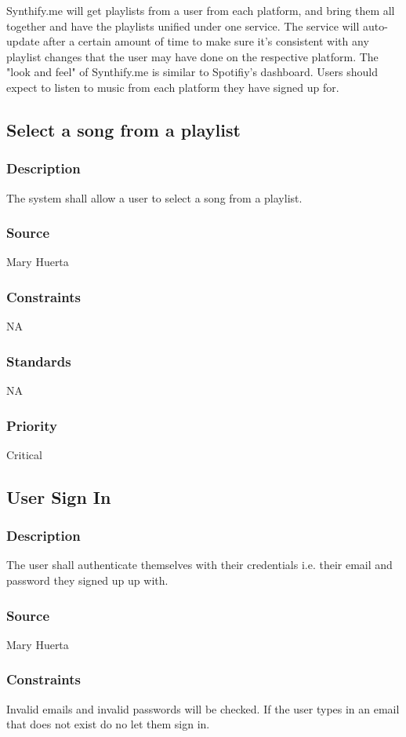 Synthify.me will get playlists from a user from each platform, and bring them all together and have the playlists unified under one service. The service will auto-update after a certain amount of time to make sure it's consistent with any playlist changes that the user may have done on the respective platform. The "look and feel" of Synthify.me is similar to Spotifiy's dashboard. Users should expect to listen to music from each platform they have signed up for.

\subsection{Select a song from a playlist}
\subsubsection{Description}
The system shall allow a user to select a song from a playlist.
\subsubsection{Source}
Mary Huerta
\subsubsection{Constraints}
NA
\subsubsection{Standards}
NA
\subsubsection{Priority}
Critical


\subsection{User Sign In}
\subsubsection{Description}
The user shall authenticate themselves with their credentials i.e. their email and password they signed up up with.
\subsubsection{Source}
Mary Huerta
\subsubsection{Constraints}
Invalid emails and invalid passwords will be checked. If the user types in an email that does not exist do no let them sign in.
